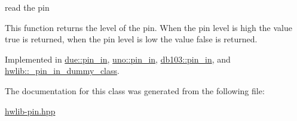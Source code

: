 read the pin 

This function returns the level of the pin. When the pin level is high the value true is returned, when the pin level is low the value false is returned. 

Implemented in \hyperlink{classdue_1_1pin__in_abfadd4fd4c1aef21c1243bc69ce55b1c}{due\+::pin\+\_\+in}, \hyperlink{classuno_1_1pin__in_ae5e5e3db2a5616ea3ba147739ac747ef}{uno\+::pin\+\_\+in}, \hyperlink{classdb103_1_1pin__in_a553663fb9fbb81aad104c0d52cff4839}{db103\+::pin\+\_\+in}, and \hyperlink{classhwlib_1_1__pin__in__dummy__class_a2b51c1a0d291cd4414e70504d388c9cb}{hwlib\+::\+\_\+pin\+\_\+in\+\_\+dummy\+\_\+class}.



The documentation for this class was generated from the following file\+:\begin{DoxyCompactItemize}
\item 
\hyperlink{hwlib-pin_8hpp}{hwlib-\/pin.\+hpp}\end{DoxyCompactItemize}
